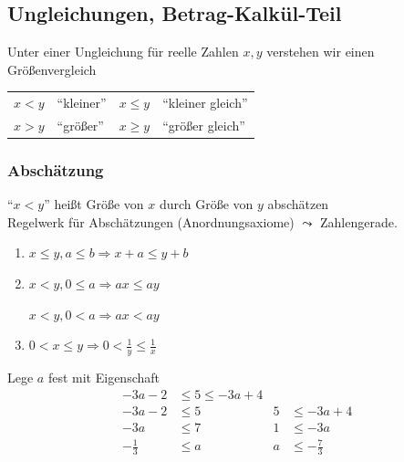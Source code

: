 \newpage
{}

\subsection{Ungleichungen, Betrag-Kalkül-Teil}

\begin{definition}[Ungleichung]
Unter einer Ungleichung für reelle Zahlen $x,y$ verstehen wir einen Größenvergleich

  \begin{table}[h]
    \centering
    \begin{tabular}{|ll||ll|}
      \hline
      $x<y$ & "`kleiner"' & $x\leq y$ & "`kleiner gleich"' \\ 
      $x>y$ & "`größer"' & $x \geq y$ & "`größer gleich"' \\\hline
    \end{tabular}
  \end{table}
  
\end{definition}

\subsubsection*{Abschätzung}

"`$x<y$"' heißt Größe von $x$ durch Größe von $y$ abschätzen\\
Regelwerk für Abschätzungen (Anordnungsaxiome) $\leadsto$ Zahlengerade.

\begin{enumerate}
 \item $x \leq y, a\leq b \Rightarrow x+a \leq y+b$
 \item $x<y, 0 \leq a \Rightarrow ax \leq ay$
 
$x<y, 0 < a \Rightarrow ax < ay$
 \item $0<x\leq y \Rightarrow 0 < \frac{1}{y} \leq \frac{1}{x}$
\end{enumerate}

\begin{example}
Lege $a$ fest mit Eigenschaft
\begin{align*}
-3a-2        &\leq 5 \leq -3a+4  &&\\
-3a-2        &\leq 5 & 5 &\leq -3a+4 \\
-3a          &\leq 7 & 1 &\leq -3a \\
-\frac{1}{3} &\leq a & a &\leq -\frac{7}{3}
\end{align*}

\end{example}

